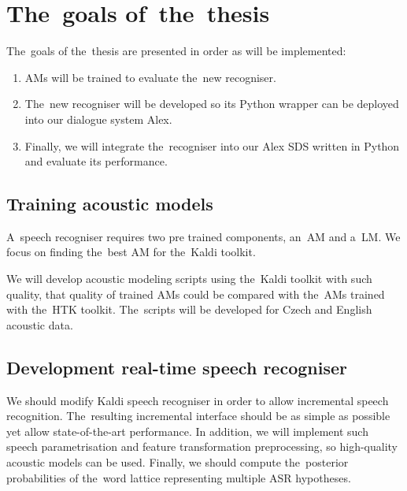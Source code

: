 \section{The~goals of~the~thesis} 
\label{sec:goals}
The~goals of the~thesis are presented in order as will be implemented:
\begin{enumerate}
    \item \acp{AM} will be trained to evaluate the~new recogniser.
    \item The~new recogniser will be developed so its Python wrapper can be deployed into our dialogue system Alex.
    \item Finally, we will integrate the~recogniser into our Alex \ac{SDS} written in Python and evaluate its performance.
\end{enumerate}

\subsection{Training acoustic models} 
\label{sub:training_kaldi_acoustic_models}
A~speech recogniser requires two pre trained components, an~\acl{AM} and a~\acl{LM}. 
We focus on finding the~best \acl{AM} for the~Kaldi toolkit. 

We will develop acoustic modeling scripts using the~Kaldi toolkit with such quality, that quality of trained \acp{AM} could be compared with the~\acp{AM} trained with the~\ac{HTK} toolkit. 
The~scripts will be developed for Czech and English acoustic data.

\subsection{Development real-time speech recogniser} 
\label{sub:compare_rt}

We should modify Kaldi speech recogniser in order to allow incremental speech recognition.
The~resulting incremental interface should be as simple as possible yet allow state-of-the-art performance.
In addition, we will implement such speech parametrisation and feature transformation preprocessing, so high-quality acoustic models can be used.
Finally, we should compute the~posterior probabilities of the~word lattice representing multiple \ac{ASR} hypotheses.


